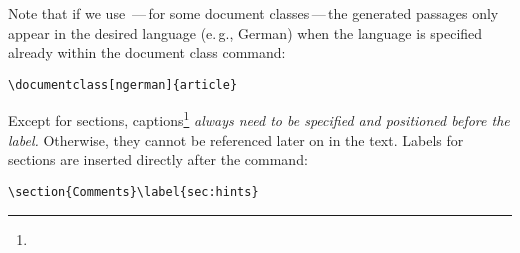 Note that if we use \,---\,for some document classes\,---\,the generated passages only appear in the desired language (e.\,g., German) when the language is specified already within the document class command:

\begin{verbatim}
\documentclass[ngerman]{article}
\end{verbatim}

	\noindent Except for sections, captions\footnote{} \emph{always need to be specified and positioned before the label}\textit{.} Otherwise, they cannot be referenced later on in the text.
	Labels for sections are inserted directly after the command:

\begin{verbatim}
\section{Comments}\label{sec:hints}
\end{verbatim}
